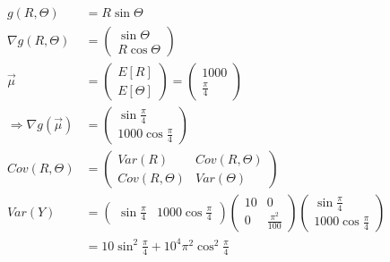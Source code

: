 \documentclass{article}
\begin{document}
     \begin{equation*}
     \begin{split}
         g(R,\Theta) &= R \sin \Theta\\
         \nabla g(R,\Theta) &= \begin{pmatrix}
                \sin \Theta \\
                R \cos \Theta
            \end{pmatrix}\\
        \vec{\mu} &= \begin{pmatrix}
            E[R]\\
            E[\Theta]
        \end{pmatrix} = \begin{pmatrix}
            1000\\
            \frac{\pi}{4}
        \end{pmatrix}\\
        \Rightarrow \nabla g(\vec{\mu}) &= \begin{pmatrix}
            \sin \frac{\pi}{4}\\
            1000 \cos \frac{\pi}{4}
        \end{pmatrix}\\
        Cov(R,\Theta) &= \begin{pmatrix}
            Var(R) & Cov(R,\Theta)\\
            Cov(R,\Theta) & Var(\Theta)
        \end{pmatrix}\\
        Var(Y) &= \begin{pmatrix}
            \sin \frac{\pi}{4} & 1000 \cos \frac{\pi}{4}
        \end{pmatrix} \begin{pmatrix}  
                10 & 0\\
                0 & \frac{\pi^2}{100}
            \end{pmatrix} \begin{pmatrix}
                    \sin \frac{\pi}{4}\\
                    1000 \cos \frac{\pi}{4}
                \end{pmatrix}\\
                &= 10 \sin^2 \frac{\pi}{4} + 10^4 \pi^2 \cos^2 \frac{\pi}{4}
        \end{split}
    \end{equation*}
    
\end{document}
